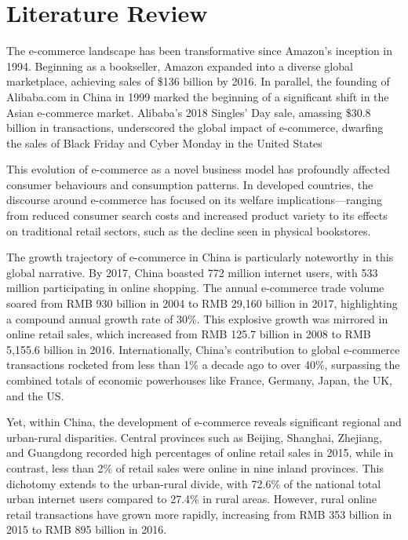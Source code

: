\documentclass{article}
\begin{document}
\section{Literature Review}
The e-commerce landscape has been transformative since Amazon's inception in 1994. Beginning as a bookseller, Amazon expanded into a diverse global marketplace, achieving sales of \$136 billion by 2016. In parallel, the founding of Alibaba.com in China in 1999 marked the beginning of a significant shift in the Asian e-commerce market. Alibaba's 2018 Singles' Day sale, amassing \$30.8 billion in transactions, underscored the global impact of e-commerce, dwarfing the sales of Black Friday and Cyber Monday in the United States\cite{luo2019commerce}

This evolution of e-commerce as a novel business model has profoundly affected consumer behaviours and consumption patterns\cite{fan2018alibaba}. In developed countries, the discourse around e-commerce has focused on its welfare implications—ranging from reduced consumer search costs and increased product variety to its effects on traditional retail sectors, such as the decline seen in physical bookstores.

The growth trajectory of e-commerce in China is particularly noteworthy in this global narrative. By 2017, China boasted 772 million internet users, with 533 million participating in online shopping. The annual e-commerce trade volume soared from RMB 930 billion in 2004 to RMB 29,160 billion in 2017, highlighting a compound annual growth rate of 30\%. This explosive growth was mirrored in online retail sales, which increased from RMB 125.7 billion in 2008 to RMB 5,155.6 billion in 2016. Internationally, China's contribution to global e-commerce transactions rocketed from less than 1\% a decade ago to over 40\%, surpassing the combined totals of economic powerhouses like France, Germany, Japan, the UK, and the US\cite{luo2019commerce}.

Yet, within China, the development of e-commerce reveals significant regional and urban-rural disparities. Central provinces such as Beijing, Shanghai, Zhejiang, and Guangdong recorded high percentages of online retail sales in 2015, while in contrast, less than 2\% of retail sales were online in nine inland provinces. This dichotomy extends to the urban-rural divide, with 72.6\% of the national total urban internet users compared to 27.4\% in rural areas\cite{mofcom2016ecommerce}. However, rural online retail transactions have grown more rapidly, increasing from RMB 353 billion in 2015 to RMB 895 billion in 2016\cite{mofcom2016ecommerce}.
\end{document}
